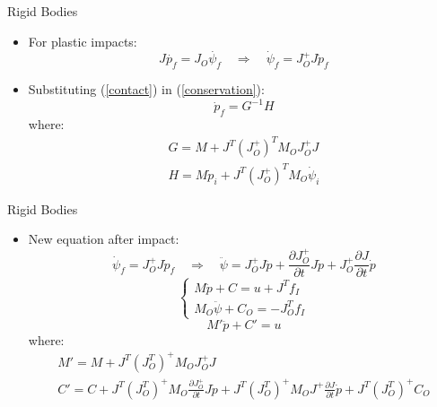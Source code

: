 \begin{frame}{Rigid Bodies}
    \begin{itemize}
        \item For plastic impacts:
        \begin{equation}
            J\dot{p_f}=J_O\dot{\psi_f} \quad \Rightarrow \quad  \dot{\psi}_f=J_O^+J\dot{p}_f
            \label{contact}
          \end{equation}
        \item Substituting (\ref{contact}) in (\ref{conservation}):
        \begin{equation}
            \dot{p}_f=G^{-1}H
        \end{equation}
        where:
        \begin{equation}
            \begin{array}{l}
              G=M+J^T(J_O^+)^TM_OJ_O^+J\\
              H=M\dot{p}_i+J^T(J_O^+)^TM_O\dot{\psi}_i
            \end{array}
          \end{equation}
    \end{itemize}
\end{frame}

\begin{frame}{Rigid Bodies}
    \begin{itemize}
        \item New equation after impact:
        \begin{equation}
            \dot{\psi}_f=J_O^+J\dot{p}_f \quad \Rightarrow \quad \ddot{\psi}=J_O^+J\ddot{p}+\frac{\partial J_O^+}{\partial t}J\dot{p}+J_O^+\frac{\partial J}{\partial t}\dot{p}
        \end{equation}
        \begin{equation*}
            \begin{cases}
              M\ddot{p}+C=u+J^Tf_I\\
              M_O\ddot{\psi}+C_O=-J_O^Tf_I
            \end{cases}
          \end{equation*}
          \begin{equation}
            M'\ddot{p}+C'=u
          \end{equation}
          where:
        \begin{equation}
        \begin{array}{l}
            M'=M+J^T(J_O^T)^+M_OJ_O^+J\\
            C'=C+J^T(J_O^T)^+M_O\frac{\partial J_O^+}{\partial t}J\dot{p}+J^T(J_O^T)^+M_OJ^+\frac{\partial J}{\partial t}\dot{p}+J^T(J_O^T)^+C_O
        \end{array}
        \end{equation}
    \end{itemize}
\end{frame}

